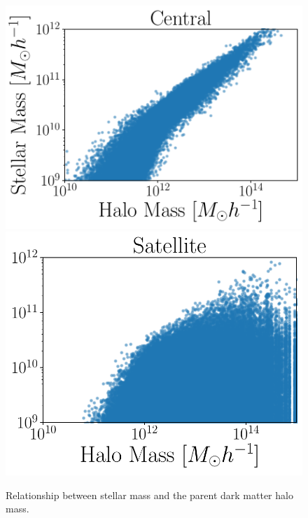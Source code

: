 \documentclass[fleqn,usenatbib]{mnras}
\begin{document}
\begin{figure}
    \centering
     \includegraphics[width=1\columnwidth]{figuras/CH.pdf}
    \includegraphics[width=0.9\columnwidth]{figuras/SH.pdf}
    \caption{Relationship between stellar mass and the parent dark
      matter halo mass.} 
    \label{fig:stellar_to_halo}
\end{figure}
\end{document}
